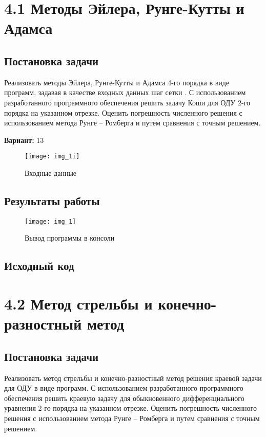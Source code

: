 \section* {4.1 Методы Эйлера, Рунге-Кутты и Адамса}

\subsection{Постановка задачи}
Реализовать методы Эйлера, Рунге-Кутты и Адамса 4-го порядка в виде программ, задавая в качестве входных данных шаг сетки  . С использованием разработанного программного обеспечения решить задачу Коши для ОДУ 2-го порядка на указанном отрезке. Оценить погрешность численного решения с использованием метода Рунге – Ромберга и путем сравнения с точным решением. 

{\bfseries Вариант:} 13

\begin{figure}[h!]
\centering
\texttt{[image: img\_1i]}
\caption{Входные данные}
\end{figure}

\subsection{Результаты работы}
\begin{figure}[h!]
\centering
\texttt{[image: img\_1]}
\caption{Вывод программы в консоли}
\end{figure}

\pagebreak

\subsection{Исходный код}


\pagebreak

\section* {4.2 Метод стрельбы и конечно-разностный метод}

\subsection{Постановка задачи}
Реализовать метод стрельбы и конечно-разностный метод решения краевой задачи для ОДУ в виде программ. С использованием разработанного программного обеспечения решить краевую задачу для обыкновенного дифференциального уравнения 2-го порядка на указанном отрезке. Оценить погрешность численного решения с использованием метода Рунге – Ромберга и путем сравнения с точным решением. 

